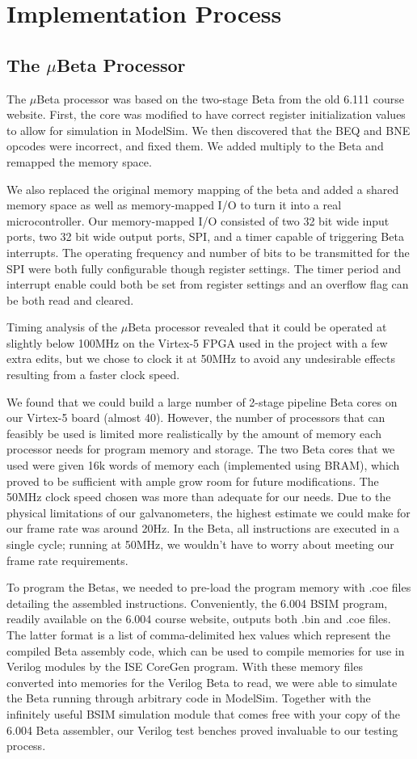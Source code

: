 \documentclass{article}
\begin{document}
\section{Implementation Process} \label{implementation}
\subsection{The $\mu$Beta Processor} \label{mbeta}
The $\mu$Beta processor was based on the two-stage Beta from the old 6.111 course website.  First, the core was modified to have correct register initialization values to allow for simulation in ModelSim. We then discovered that the BEQ and BNE opcodes were incorrect, and fixed them. We added multiply to the Beta and remapped the memory space. 

We also replaced the original memory mapping of the beta and added a shared memory space as well as memory-mapped I/O to turn it into a real microcontroller. Our memory-mapped I/O consisted of two 32 bit wide input ports, two 32 bit wide output ports, SPI, and a timer capable of triggering Beta interrupts. The operating frequency and number of bits to be transmitted for the SPI were both fully configurable though register settings. The timer period and interrupt enable could both be set from register settings and an overflow flag can be both read and cleared. 

Timing analysis of the $\mu$Beta processor revealed that it could be operated at slightly below 100MHz on the Virtex-5 FPGA used in the project with a few extra edits, but we chose to clock it at 50MHz to avoid any undesirable effects resulting from a faster clock speed. 

We found that we could build a large number of 2-stage pipeline \gls{Beta} cores on our Virtex-5 board (almost 40). However, the number of processors that can feasibly be used is limited more realistically by the amount of memory each processor needs for program memory and storage. The two Beta cores that we used were given 16k words of memory each (implemented using BRAM), which proved to be sufficient with ample grow room for future modifications. The 50MHz clock speed chosen was more than adequate for our needs. Due to the physical limitations of our galvanometers, the highest estimate we could make for our frame rate was around 20Hz. In the Beta, all instructions are executed in a single cycle; running at 50MHz, we wouldn't have to worry about meeting our frame rate requirements.

To program the Betas, we needed to pre-load the program memory with .coe files detailing the assembled instructions. Conveniently, the 6.004 BSIM program, readily available on the 6.004 course website, outputs both .bin and .coe files. The latter format is a list of comma-delimited hex values which represent the compiled Beta assembly code, which can be used to compile memories for use in Verilog modules by the ISE CoreGen program. With these memory files converted into memories for the Verilog Beta to read, we were able to simulate the Beta running through arbitrary code in ModelSim. Together with the infinitely useful BSIM simulation module that comes free with your copy of the 6.004 Beta assembler, our Verilog test benches proved invaluable to our testing process.
\end{document}
